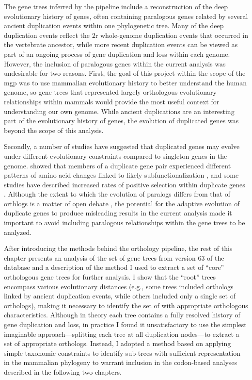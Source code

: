 The gene trees inferred by the \cmp pipeline include a reconstruction
of the deep evolutionary history of genes, often containing paralogous
genes related by several ancient duplication events within one
phylogenetic tree. Many of the deep duplication events reflect the
\ac{2r} whole-genome duplication events that occurred in the
vertebrate ancestor, while more recent duplication events can be
viewed as part of an ongoing process of gene duplication and loss
within each genome. However, the inclusion of paralogous genes within
the current analysis was undesirable for two reasons. First, the goal
of this project within the scope of the \ac{mgp} was to use mammalian
evolutionary history to better understand the human genome, so gene
trees that represented largely orthologous evolutionary relationships
within mammals would provide the most useful context for understanding
our own genome. While ancient duplications are an interesting part of
the evolutionary history of genes, the evolution of duplicated genes
was beyond the scope of this analysis.

Secondly, a number of studies have suggested that duplicated genes may
evolve under different evolutionary constraints compared to singleton
genes in the genome. \citet{Dermitzakis2001a} showed that members of a
duplicate gene pair experienced different patterns of amino acid
changes linked to likely subfunctionalization \citep{Massingham2001},
and some studies have described increased rates of positive selection
within duplicate genes
\citep{Lynch2000,Zhang2002,He2005,Hahn2009a}. Although the extent to
which the evolution of paralogs differs from that of orthlogs is a
matter of open debate \citep{Nembaware2002,Jordan2004,Studer2009}, the
potential for the adaptive evolution of duplicate genes to produce
misleading results in the current analysis made it important to avoid
including paralogous relationships within the gene trees to be
analyzed.

After introducing the methods behind the \cmp orthology pipeline, the
rest of this chapter presents an analysis of the set of gene trees
from version 63 of the \ens \cmp database and a description of the
method I used to extract a set of ``core'' orthologous gene trees for
further analysis. I show that the ``root'' \cmp trees encompass
various evolutionary distances (e.g., some trees included orthologs
linked by ancient duplication events, while others included only a
single set of orthologs), making it necessary to identify the set of
\subtr with appropriate orthologous characteristics. Although in
theory each \cmp tree contains a fully resolved history of gene
duplication and loss, in practice I found it unsatisfactory to use the
simplest imaginable approach---splitting each tree at all duplication
nodes---to extract a set of appropriate orthologs. Instead, I adopted
a method based on applying simple taxonomic constraints to identify
sub-trees with sufficient representation in the mammalian phylogeny to
warrant inclusion in the codon-based analyses described in the
following two chapters.

